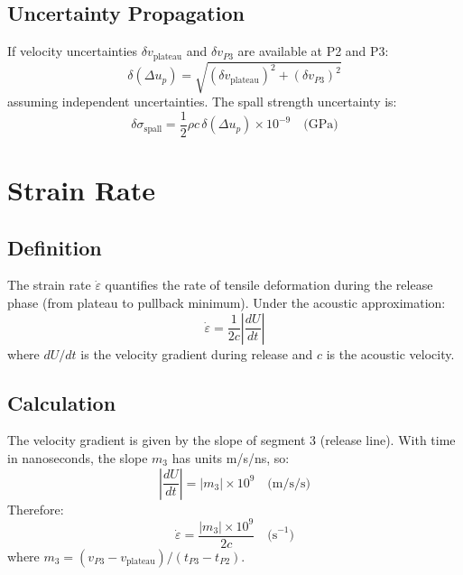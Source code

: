 \subsection{Uncertainty Propagation}
If velocity uncertainties $\delta v_{\text{plateau}}$ and $\delta v_{P3}$ are available at P2 and P3:
\begin{equation}
\delta(\Delta u_p) = \sqrt{(\delta v_{\text{plateau}})^2 + (\delta v_{P3})^2}
\end{equation}
assuming independent uncertainties. The spall strength uncertainty is:
\begin{equation}
\delta\sigma_{\text{spall}} = \frac{1}{2} \rho c \, \delta(\Delta u_p) \times 10^{-9} \quad \text{(GPa)}
\end{equation}

\section{Strain Rate}

\subsection{Definition}
The strain rate $\dot{\varepsilon}$ quantifies the rate of tensile deformation during the release phase (from plateau to pullback minimum). Under the acoustic approximation:
\begin{equation}
\dot{\varepsilon} = \frac{1}{2c} \left| \frac{dU}{dt} \right|
\end{equation}
where $dU/dt$ is the velocity gradient during release and $c$ is the acoustic velocity.

\subsection{Calculation}
The velocity gradient is given by the slope of segment 3 (release line). With time in nanoseconds, the slope $m_3$ has units m/s/ns, so:
\begin{equation}
\left| \frac{dU}{dt} \right| = |m_3| \times 10^9 \quad \text{(m/s/s)}
\end{equation}
Therefore:
\begin{equation}
\dot{\varepsilon} = \frac{|m_3| \times 10^9}{2c} \quad \text{(s}^{-1}\text{)}
\end{equation}
where $m_3 = (v_{P3} - v_{\text{plateau}}) / (t_{P3} - t_{P2})$.

